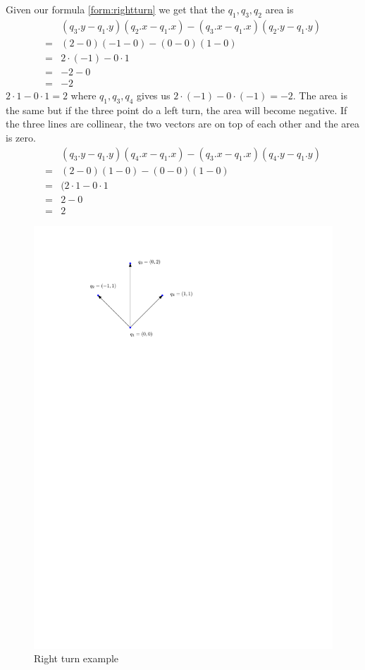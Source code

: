 Given our formula \ref{form:rightturn} we get that the $q_1,q_3,q_2$ area is
\begin{align*}
	&(q_3.y-q_1.y)(q_2.x-q_1.x)-(q_3.x-q_1.x)(q_2.y-q_1.y)\\ 
	= &(2-0)(-1-0)-(0-0)(1-0)\\
	= & 2\cdot (-1)-0\cdot1\\
	= & -2-0\\
	= & -2
\end{align*}
$2\cdot1-0\cdot1=2$ where $q_1,q_3,q_4$ gives us $2\cdot(-1)-0\cdot(-1)=-2$.
The area is the same but if the three point do a left turn, the area will
become negative. If the three lines are collinear, the two vectors are on top
of each other and the area is zero.
\begin{align*}
	&(q_3.y-q_1.y)(q_4.x-q_1.x)-(q_3.x-q_1.x)(q_4.y-q_1.y)\\ 
	= &(2-0)(1-0)-(0-0)(1-0)\\
	= &(2\cdot 1 - 0\cdot 1\\
	= &2-0\\
	= &2
\end{align*}
\begin{figure}[H]
    \centering
	\includegraphics{figures/rightturn3.pdf}
	\caption{Right turn example}
    \label{rightturn3}
\end{figure}
